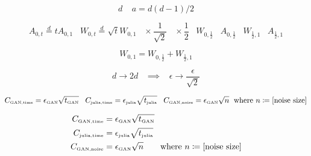\documentclass[a4paper,11pt]{article}
\begin{document}
\[
d \;\;\;\; a = d(d-1)/2
\]

\[
A_{0,t} \overset{d}{=} t A_{0,1} \;\;\; W_{0,t} \overset{d}{=} \sqrt{t} W_{0,1} \;\;\; \times \frac{1}{\sqrt{2}} \;\;\; \times \frac{1}{2} \;\;\; W_{0,\frac{1}{2}} \;\;\; A_{0,\frac{1}{2}} \;\;\; W_{\frac{1}{2}, 1} \;\;\; A_{\frac{1}{2}, 1}
\]

\[
W_{0,1} = W_{0,\frac{1}{2}} + W_{\frac{1}{2}, 1}
\]

\[
d \rightarrow 2d \;\;\; \implies \;\;\; \epsilon \rightarrow \frac{\epsilon}{\sqrt{2}}
\]

\[
C_{\text{\tiny GAN,time}} = \epsilon_{\text{\tiny GAN}} \sqrt{t_{\text{\tiny GAN}}}  \;\;\; C_{\text{\tiny julia,time}} = \epsilon_{\text{\tiny julia}} \sqrt{t_{\text{\tiny julia}}}  \;\;\; C_{\text{\tiny GAN,noise}} = \epsilon_{\text{\tiny GAN}} \sqrt{n} \;\text{ where } n \coloneqq \text{[noise size]}
\]

\begin{align}
    C_{\text{\tiny GAN,time}} &= \epsilon_{\text{\tiny GAN}} \sqrt{t_{\text{\tiny GAN}}} \\        
    C_{\text{\tiny julia,time}} &= \epsilon_{\text{\tiny julia}} \sqrt{t_{\text{\tiny julia}}} \\
    C_{\text{\tiny GAN,noise}} &= \epsilon_{\text{\tiny GAN}} \sqrt{n} \;\;\;\;\;\; \text{ where } n \coloneqq \text{[noise size]}
\end{align}
\end{document}
